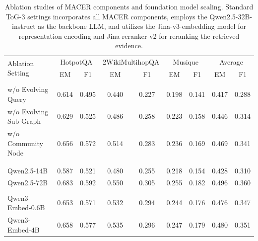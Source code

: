 \begin{table}
\centering
\caption{Ablation studies of MACER components and foundation model scaling. 
Standard ToG-3 settings incorporates all MACER components, employs the Qwen2.5-32B-instruct as the backbone LLM, and utilizes the Jina-v3-embedding model for representation encoding and Jina-reranker-v2 for reranking the retrieved evidence.
}
\small
\begin{tabular}{lcccccc|cc}
\toprule
\multirow{2}{*}{Ablation Setting} & \multicolumn{2}{c}{HotpotQA} & \multicolumn{2}{c}{2WikiMultihopQA}  & \multicolumn{2}{c}{Musique} & \multicolumn{2}{c}{Average} \\
\cmidrule(lr){2-3} \cmidrule(lr){4-5} \cmidrule(lr){6-7} \cmidrule(lr){8-9}
& EM & F1 & EM & F1 & EM & F1 & EM & F1 \\
\midrule
\rowcolor{gray!30}
\multicolumn{9}{l}{\textbf{MACER Components Ablation}} \\
w/o Evolving Query & 0.614 & 0.495 & 0.440 & 0.227 & 0.198 & 0.141 & 0.417 & 0.288 \\
w/o Evolving Sub-Graph & 0.629 & 0.525 & 0.486 & 0.258 & 0.223 & 0.158 & 0.446 & 0.314 \\
w/o Community Node & 0.656 & 0.572 & 0.514 & 0.283 & 0.236 & 0.169 & 0.469 & 0.341 \\
\midrule
\rowcolor{gray!30}
\multicolumn{9}{l}{\textbf{Foundation Model Scaling Abalation}} \\
\rowcolor{gray!10}
\multicolumn{9}{l}{\textbf{LLM Model}} \\
Qwen2.5-14B & 0.587 & 0.521 & 0.480 & 0.255 & 0.218 & 0.154 & 0.428 & 0.310 \\
Qwen2.5-72B & 0.683 & 0.592 & 0.550 & 0.305 & 0.255 & 0.182 & 0.496 & 0.360 \\
\rowcolor{gray!10}
\multicolumn{9}{l}{\textbf{Embedding Model}} \\
Qwen3-Embed-0.6B & 0.653 & 0.571 & 0.532 & 0.294 & 0.244 & 0.176 & 0.476 & 0.347 \\
Qwen3-Embed-4B & 0.658 & 0.577 & 0.535 & 0.296 & 0.247 & 0.179 & 0.480 & 0.351 \\
\bottomrule
\end{tabular}
\label{tab:ablation_studies}
\end{table}

